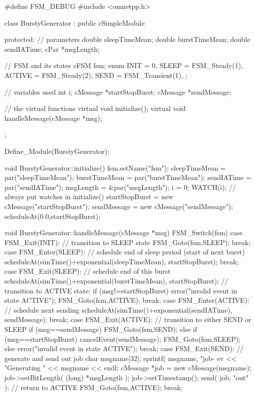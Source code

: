 \begin{cpp}
#define FSM_DEBUG
#include <omnetpp.h>

class BurstyGenerator : public cSimpleModule
{
  protected:
    // parameters
    double sleepTimeMean;
    double burstTimeMean;
    double sendIATime;
    cPar *msgLength;

    // FSM and its states
    cFSM fsm;
    enum {
      INIT = 0,
      SLEEP = FSM_Steady(1),
      ACTIVE = FSM_Steady(2),
      SEND = FSM_Transient(1),
    };

    // variables used
    int i;
    cMessage *startStopBurst;
    cMessage *sendMessage;

    // the virtual functions
    virtual void initialize();
    virtual void handleMessage(cMessage *msg);
};

Define_Module(BurstyGenerator);

void BurstyGenerator::initialize()
{
    fsm.setName("fsm");
    sleepTimeMean = par("sleepTimeMean");
    burstTimeMean = par("burstTimeMean");
    sendIATime = par("sendIATime");
    msgLength = &par("msgLength");
    i = 0;
    WATCH(i); // always put watches in initialize()
    startStopBurst = new cMessage("startStopBurst");
    sendMessage = new cMessage("sendMessage");
    scheduleAt(0.0,startStopBurst);
}

void BurstyGenerator::handleMessage(cMessage *msg)
{
   FSM_Switch(fsm)
   {
     case FSM_Exit(INIT):
       // transition to SLEEP state
       FSM_Goto(fsm,SLEEP);
       break;
     case FSM_Enter(SLEEP):
       // schedule end of sleep period (start of next burst)
       scheduleAt(simTime()+exponential(sleepTimeMean),
                  startStopBurst);
     break;
     case FSM_Exit(SLEEP):
       // schedule end of this burst
       scheduleAt(simTime()+exponential(burstTimeMean),
                  startStopBurst);
       // transition to ACTIVE state:
       if (msg!=startStopBurst) {
         error("invalid event in state ACTIVE");
       }
       FSM_Goto(fsm,ACTIVE);
       break;
     case FSM_Enter(ACTIVE):
       // schedule next sending
       scheduleAt(simTime()+exponential(sendIATime), sendMessage);
     break;
     case FSM_Exit(ACTIVE):
       // transition to either SEND or SLEEP
       if (msg==sendMessage) {
         FSM_Goto(fsm,SEND);
       } else if (msg==startStopBurst) {
         cancelEvent(sendMessage);
         FSM_Goto(fsm,SLEEP);
       } else {
         error("invalid event in state ACTIVE");
       }
       break;
     case FSM_Exit(SEND):
     {
       // generate and send out job
       char msgname[32];
       sprintf( msgname, "job-%
       ev << "Generating " << msgname << endl;
       cMessage *job = new cMessage(msgname);
       job->setBitLength( (long) *msgLength );
       job->setTimestamp();
       send( job, "out" );
       // return to ACTIVE
       FSM_Goto(fsm,ACTIVE);
       break;
     }
   }
}
\end{cpp}




